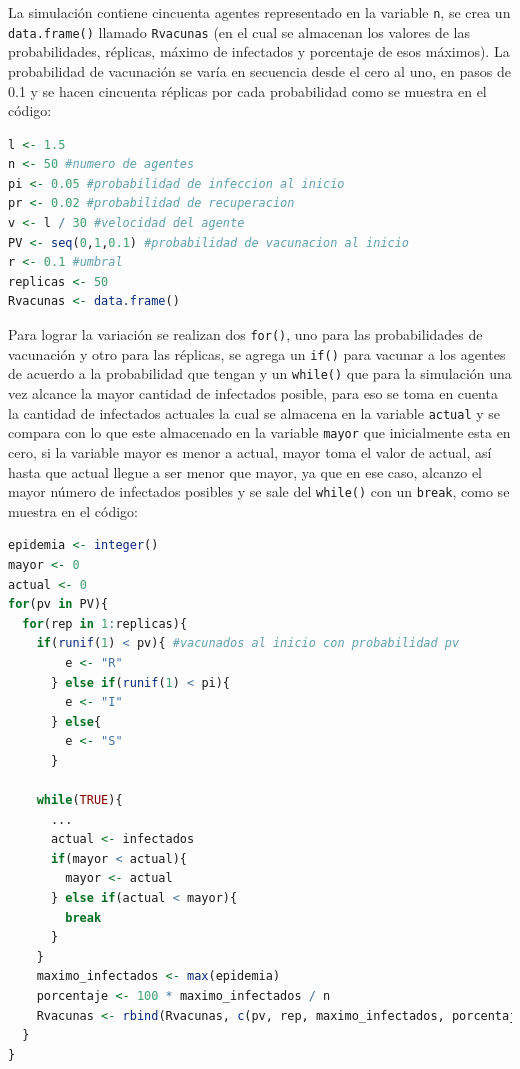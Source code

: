 \documentclass{article}
\begin{document}
La simulaci\'on contiene cincuenta agentes representado en la variable \texttt{n}, se crea un \texttt{data.frame()} llamado \texttt{Rvacunas} (en el cual se almacenan los valores de las probabilidades, r\'eplicas, m\'aximo de infectados y porcentaje de esos m\'aximos). La probabilidad de vacunaci\'on se var\'ia en secuencia desde el cero al uno, en pasos de 0.1 y se hacen cincuenta r\'eplicas por cada probabilidad como se muestra en el c\'odigo:

\begin{lstlisting}[language=R]
l <- 1.5 
n <- 50 #numero de agentes
pi <- 0.05 #probabilidad de infeccion al inicio
pr <- 0.02 #probabilidad de recuperacion
v <- l / 30 #velocidad del agente
PV <- seq(0,1,0.1) #probabilidad de vacunacion al inicio
r <- 0.1 #umbral
replicas <- 50
Rvacunas <- data.frame()
\end{lstlisting}

\newpage

Para lograr la variaci\'on se realizan dos \texttt{for()}, uno para las probabilidades de vacunaci\'on y otro para las r\'eplicas, se agrega un \texttt{if()} para vacunar a los agentes de acuerdo a la probabilidad que tengan y un \texttt{while()} que para la simulaci\'on una vez  alcance la mayor cantidad de infectados posible, para eso se toma en cuenta la cantidad de infectados actuales la cual se almacena en la variable \texttt{actual} y se compara con lo que este almacenado en la variable \texttt{mayor} que inicialmente esta en cero, si la variable mayor es menor a actual, mayor toma el valor de actual, as\'i hasta que actual llegue a ser menor que mayor, ya que en ese caso, alcanzo el mayor n\'umero de infectados posibles y se sale del \texttt{while()} con un \texttt{break}, como se muestra en el c\'odigo:

\begin{lstlisting}[language=R]
epidemia <- integer()
mayor <- 0
actual <- 0
for(pv in PV){
  for(rep in 1:replicas){
    if(runif(1) < pv){ #vacunados al inicio con probabilidad pv
        e <- "R"
      } else if(runif(1) < pi){
        e <- "I"
      } else{
        e <- "S"
      }

    while(TRUE){
      ...
      actual <- infectados
      if(mayor < actual){
        mayor <- actual
      } else if(actual < mayor){
        break
      }
    }
    maximo_infectados <- max(epidemia)
    porcentaje <- 100 * maximo_infectados / n
    Rvacunas <- rbind(Rvacunas, c(pv, rep, maximo_infectados, porcentaje))
  }
}
 
\end{lstlisting}
\end{document}
